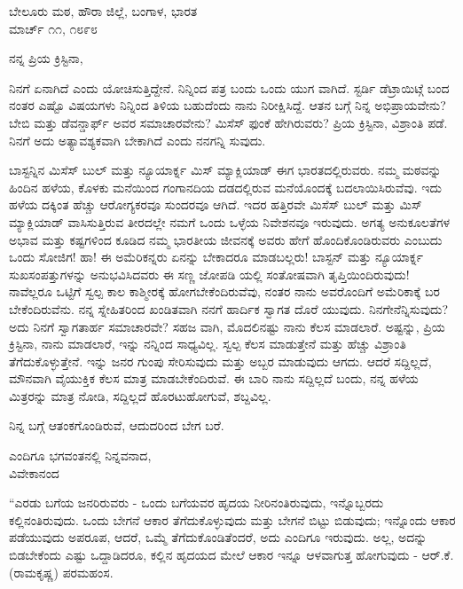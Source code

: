 \begin{flushright}
ಬೇಲೂರು ಮಠ, ಹೌರಾ ಜಿಲ್ಲೆ, ಬಂಗಾಳ, ಭಾರತ\\ಮಾರ್ಚ್ ೧೧, ೧೮೯೮
\end{flushright}

ನನ್ನ ಪ್ರಿಯ ಕ್ರಿಸ್ಟಿನಾ,

ನಿನಗೆ ಏನಾಗಿದೆ ಎಂದು ಯೋಚಿಸುತ್ತಿದ್ದೇನೆ. ನಿನ್ನಿಂದ ಪತ್ರ ಬಂದು ಒಂದು ಯುಗ ವಾಗಿದೆ. ಸ್ಟರ್ಡಿ ಡೆಟ್ರಾಯಿಟ್ಗೆ ಬಂದ ನಂತರ ಎಷ್ಟೊ ವಿಷಯಗಳು ನಿನ್ನಿಂದ ತಿಳಿಯ ಬಹುದೆಂದು ನಾನು ನಿರೀಕ್ಷಿಸಿದ್ದೆ. ಆತನ ಬಗ್ಗೆ ನಿನ್ನ ಅಭಿಪ್ರಾಯವೇನು? ಬೇಬಿ ಮತ್ತು ಡೆವನ್ಡಾರ್ಫ್ ಅವರ ಸಮಾಚಾರವೇನು? ಮಿಸೆಸ್ ಫುಂಕೆ ಹೇಗಿರುವರು? ಪ್ರಿಯ ಕ್ರಿಸ್ಟಿನಾ, ವಿಶ್ರಾಂತಿ ಪಡೆ. ನಿನಗೆ ಅದು ಅತ್ಯಾವಶ್ಯಕವಾಗಿ ಬೇಕಾಗಿದೆ ಎಂದು ನನಗನ್ನಿ ಸುವುದು.

ಬಾಸ್ಟನ್ನಿನ ಮಿಸೆಸ್ ಬುಲ್ ಮತ್ತು ನ್ಯೂಯಾರ್ಕ್ನ ಮಿಸ್ ಮ್ಯಾಕ್ಲಿಯಾಡ್ ಈಗ ಭಾರತದಲ್ಲಿರುವರು. ನಮ್ಮ ಮಠವನ್ನು ಹಿಂದಿನ ಹಳೆಯ, ಕೊಳಕು ಮನೆಯಿಂದ ಗಂಗಾನದಿಯ ದಡದಲ್ಲಿರುವ ಮನೆಯೊಂದಕ್ಕೆ ಬದಲಾಯಿಸಿರುವೆವು. ಇದು ಹಳೆಯ ದಕ್ಕಿಂತ ಹೆಚ್ಚು ಆರೋಗ್ಯಕರವೂ ಸುಂದರವೂ ಆಗಿದೆ. ಇದರ ಹತ್ತಿರವೇ ಮಿಸೆಸ್ ಬುಲ್ ಮತ್ತು ಮಿಸ್ ಮ್ಯಾಕ್ಲಿಯಾಡ್ ವಾಸಿಸುತ್ತಿರುವ ತೀರದಲ್ಲೇ ನಮಗೆ ಒಂದು ಒಳ್ಳೆಯ ನಿವೇಶನವೂ ಇರುವುದು. ಅಗತ್ಯ ಅನುಕೂಲತೆಗಳ ಅಭಾವ ಮತ್ತು ಕಷ್ಟಗಳಿಂದ ಕೂಡಿದ ನಮ್ಮ ಭಾರತೀಯ ಜೀವನಕ್ಕೆ ಅವರು ಹೇಗೆ ಹೊಂದಿಕೊಂಡಿರುವರು ಎಂಬುದು ಒಂದು ಸೋಜಿಗ! ಹಾ! ಈ ಅಮೆರಿಕನ್ನರು ಏನನ್ನು ಬೇಕಾದರೂ ಮಾಡಬಲ್ಲರು! ಬಾಸ್ಟನ್ ಮತ್ತು ನ್ಯೂಯಾರ್ಕ್ನ ಸುಖಸಂಪತ್ತುಗಳನ್ನು ಅನುಭವಿಸಿದವರು ಈ ಸಣ್ಣ ಜೋಪಡಿ ಯಲ್ಲಿ ಸಂತೋಷವಾಗಿ ತೃಪ್ತಿಯಿಂದಿರುವುದು! ನಾವೆಲ್ಲರೂ ಒಟ್ಟಿಗೆ ಸ್ವಲ್ಪ ಕಾಲ ಕಾಶ್ಮೀರಕ್ಕೆ ಹೋಗಬೇಕೆಂದಿರುವೆವು, ನಂತರ ನಾನು ಅವರೊಂದಿಗೆ ಅಮೆರಿಕಾಕ್ಕೆ ಬರ ಬೇಕೆಂದಿರುವೆನು. ನನ್ನ ಸ್ನೇಹಿತರಿಂದ ಖಂಡಿತವಾಗಿ ನನಗೆ ಹಾರ್ದಿಕ ಸ್ವಾಗತ ದೊರೆ ಯುವುದು. ನಿನಗೇನೆನ್ನಿಸುವುದು? ಅದು ನಿನಗೆ ಸ್ವಾಗತಾರ್ಹ ಸಮಾಚಾರವೇ? ಸಹಜ ವಾಗಿ, ಮೊದಲಿನಷ್ಟು ನಾನು ಕೆಲಸ ಮಾಡಲಾರೆ. ಅಷ್ಟನ್ನು, ಪ್ರಿಯ ಕ್ರಿಸ್ಟಿನಾ, ನಾನು ಮಾಡಲಾರೆ, ಇನ್ನು ನನ್ನಿಂದ ಸಾಧ್ಯವಿಲ್ಲ. ಸ್ವಲ್ಪ ಕೆಲಸ ಮಾಡುತ್ತೇನೆ ಮತ್ತು ಹೆಚ್ಚು ವಿಶ್ರಾಂತಿ ತೆಗೆದುಕೊಳ್ಳುತ್ತೇನೆ. ಇನ್ನು ಜನರ ಗುಂಪು ಸೇರಿಸುವುದು ಮತ್ತು ಅಬ್ಬರ ಮಾಡುವುದು ಆಗದು. ಆದರೆ ಸದ್ದಿಲ್ಲದೆ, ಮೌನವಾಗಿ ವೈಯುಕ್ತಿಕ ಕೆಲಸ ಮಾತ್ರ ಮಾಡಬೇಕೆಂದಿರುವೆ. ಈ ಬಾರಿ ನಾನು ಸದ್ದಿಲ್ಲದೆ ಬಂದು, ನನ್ನ ಹಳೆಯ ಮಿತ್ರರನ್ನು ಮಾತ್ರ ನೋಡಿ, ಸದ್ದಿಲ್ಲದೆ ಹೊರಟುಹೋಗುವೆ, ಶಬ್ದವಿಲ್ಲ.

ನಿನ್ನ ಬಗ್ಗೆ ಆತಂಕಗೊಂಡಿರುವೆ, ಆದುದರಿಂದ ಬೇಗ ಬರೆ.

\begin{flushright}
ಎಂದಿಗೂ ಭಗವಂತನಲ್ಲಿ ನಿನ್ನವನಾದ,\\ವಿವೇಕಾನಂದ
\end{flushright}

“ಎರಡು ಬಗೆಯ ಜನರಿರುವರು - ಒಂದು ಬಗೆಯವರ ಹೃದಯ ನೀರಿನಂತಿರುವುದು, ಇನ್ನೊಬ್ಬರದು ಕಲ್ಲಿನಂತಿರುವುದು. ಒಂದು ಬೇಗನೆ ಆಕಾರ ತೆಗೆದುಕೊಳ್ಳುವುದು ಮತ್ತು ಬೇಗನೆ ಬಿಟ್ಟು ಬಿಡುವುದು; ಇನ್ನೊಂದು ಆಕಾರ ಪಡೆಯುವುದು ಅಪರೂಪ, ಆದರೆ, ಒಮ್ಮೆ ತೆಗೆದುಕೊಂಡಿತೆಂದರೆ, ಅದು ಎಂದಿಗೂ ಇರುವುದು. ಅಲ್ಲ, ಅದನ್ನು ಬಿಡಬೇಕೆಂದು ಎಷ್ಟು ಒದ್ದಾಡಿದರೂ, ಕಲ್ಲಿನ ಹೃದಯದ ಮೇಲೆ ಆಕಾರ ಇನ್ನೂ ಆಳವಾಗುತ್ತ ಹೋಗುವುದು - ಆರ್.ಕೆ. (ರಾಮಕೃಷ್ಣ) ಪರಮಹಂಸ.

